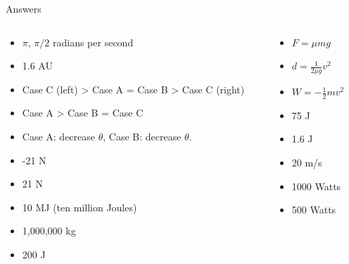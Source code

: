 \documentclass{beamer}
\begin{document}
\begin{frame}{Answers}
\begin{columns}[T]
\begin{column}{0.5\textwidth}
\begin{itemize}
\item $\pi$, $\pi/2$ radians per second
\item 1.6 AU
\item Case C (left) > Case A = Case B > Case C (right)
\item Case A > Case B = Case C
\item Case A: decrease $\theta$, Case B: decrease $\theta$.
\item -21 N
\item 21 N
\item 10 MJ (ten million Joules)
\item 1,000,000 kg
\item 200 J
\end{itemize}
\end{column}
\begin{column}{0.5\textwidth}
\begin{itemize}
\item $F = \mu m g$
\item $d = \frac{1}{2\mu g} v^2$
\item $W = -\frac{1}{2} m v^2$
\item 75 J
\item 1.6 J
\item 20 m/s
\item 1000 Watts
\item 500 Watts
\end{itemize}
\end{column}
\end{columns}
\end{frame}
\end{document}
